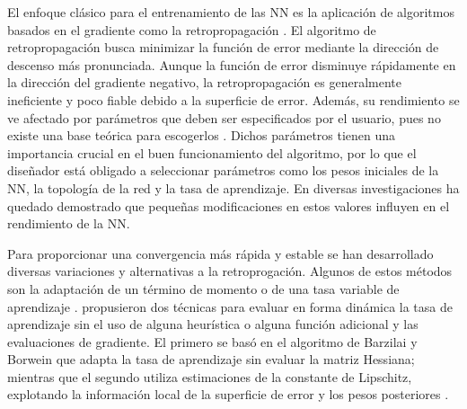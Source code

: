 El enfoque clásico para el entrenamiento de las NN es la aplicación de algoritmos basados en el gradiente como la retropropagación \cite{Rumelhart1986b}. El algoritmo de retropropagación busca minimizar la función de error mediante la dirección de descenso más pronunciada. Aunque la función de error disminuye rápidamente en la dirección del gradiente negativo, la retropropagación es generalmente ineficiente y poco fiable \cite{Gori1992} debido a la superficie de error. Además, su rendimiento se ve afectado por parámetros que deben ser especificados por el usuario, pues no existe una base teórica para escogerlos \cite{Nguyen1990}. Dichos parámetros tienen una importancia crucial en el buen funcionamiento del algoritmo, por lo que el diseñador está obligado a seleccionar parámetros como los pesos iniciales de la NN, la topología de la red y la tasa de aprendizaje. En diversas investigaciones \cite{Cauchy1847, Grippo1994, Plagianakos1998, Plagianakos2002} ha quedado demostrado que pequeñas modificaciones en estos valores influyen en el rendimiento de la NN.

Para proporcionar una convergencia más rápida y estable se han desarrollado diversas variaciones y alternativas a la retroprogación. Algunos de estos métodos son la adaptación de un término de momento \cite{Jacobs1988, Rumelhart1986b} o de una tasa variable de aprendizaje \cite{Jacobs1988,Vogl1988}.  propusieron dos técnicas para evaluar en forma dinámica la tasa de aprendizaje sin el uso de alguna heurística o alguna función adicional y las evaluaciones de gradiente. El primero se basó en el algoritmo de Barzilai y Borwein \cite{Barzilai1988} que adapta la tasa de aprendizaje sin evaluar la matriz Hessiana; mientras que el segundo utiliza estimaciones de la constante de Lipschitz, explotando la información local de la superficie de error y los pesos posteriores \cite{Magoulas1997}.%

